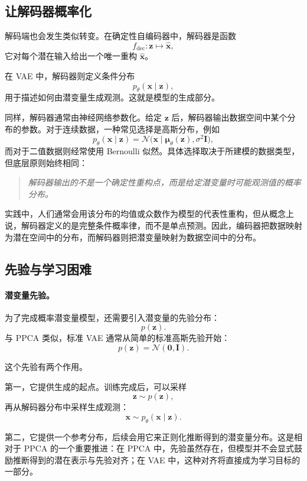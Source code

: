 \subsection{让解码器概率化}

解码端也会发生类似转变。在确定性自编码器中，解码器是函数
\[
f_{\text{dec}}:\mathbf{z}\mapsto\hat{\mathbf{x}},
\]
它对每个潜在输入给出一个唯一重构 \(\hat{\mathbf{x}}\)。

在 VAE 中，解码器则定义条件分布
\[
p_{\theta}(\mathbf{x}\mid\mathbf{z}),
\]
用于描述如何由潜变量生成观测。这就是模型的生成部分。

同样，解码器通常由神经网络参数化。给定 \(\mathbf{z}\) 后，解码器输出数据空间中某个分布的参数。对于连续数据，一种常见选择是高斯分布，例如
\[
p_{\theta}(\mathbf{x}\mid\mathbf{z})
=
\mathcal{N}\!\bigl(
\mathbf{x}\mid
\boldsymbol{\mu}_{\theta}(\mathbf{z}),
\sigma^2\mathbf{I}
\bigr),
\]
而对于二值数据则经常使用 Bernoulli 似然。具体选择取决于所建模的数据类型，但底层原则始终相同：
\begin{quote}
\emph{解码器输出的不是一个确定性重构点，而是给定潜变量时可能观测值的概率分布。}
\end{quote}

实践中，人们通常会用该分布的均值或众数作为模型的代表性重构，但从概念上说，解码器定义的是完整条件概率律，而不是单点预测。因此，编码器把数据映射为潜在空间中的分布，而解码器则把潜变量映射为数据空间中的分布。

\subsection{先验与学习困难}

\paragraph{潜变量先验。}
为了完成概率潜变量模型，还需要引入潜变量的先验分布：
\[
p(\mathbf{z}).
\]
与 PPCA 类似，标准 VAE 通常从简单的标准高斯先验开始：
\[
p(\mathbf{z})=\mathcal{N}(\mathbf{0},\mathbf{I}).
\]

这个先验有两个作用。

第一，它提供生成的起点。训练完成后，可以采样
\[
\mathbf{z}\sim p(\mathbf{z}),
\]
再从解码器分布中采样生成观测：
\[
\mathbf{x}\sim p_{\theta}(\mathbf{x}\mid\mathbf{z}).
\]

第二，它提供一个参考分布，后续会用它来正则化推断得到的潜变量分布。这是相对于 PPCA 的一个重要推进：在 PPCA 中，先验虽然存在，但模型并不会显式鼓励推断得到的潜在表示与先验对齐；在 VAE 中，这种对齐将直接成为学习目标的一部分。

